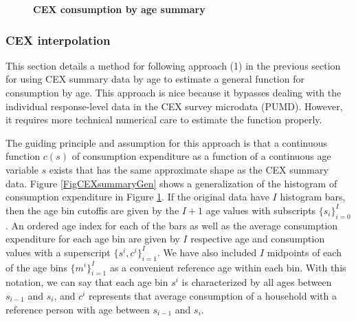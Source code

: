 \documentclass[letterpaper,12pt]{article}
\theoremstyle{definition}
\begin{document}
    \begin{figure}[htb]\centering\captionsetup{width=4.0in}
      \caption{\textbf{CEX consumption by age summary}}\label{FigCEXsummary}
    \end{figure}


    \subsubsection{CEX interpolation}\label{SecDataConsInterp}

      This section details a method for following approach (1) in the previous section for using CEX summary data by age to estimate a general function for consumption by age. This approach is nice because it bypasses dealing with the individual response-level data in the CEX survey microdata (PUMD). However, it requires more technical numerical care to estimate the function properly.

      The guiding principle and assumption for this approach is that a continuous function $c(s)$ of consumption expenditure as a function of a continuous age variable $s$ exists that has the same approximate shape as the CEX summary data. Figure \ref{FigCEXsummaryGen} shows a generalization of the histogram of consumption expenditure in Figure \ref{FigCEXsummary}. If the original data have $I$ histogram bars, then the age bin cutoffis are given by the $I+1$ age values with subscripts $\{s_i\}_{i=0}^I$. An ordered age index for each of the bars as well as the average consumption expenditure for each age bin are given by $I$ respective age and consumption values with a superscript $\{s^i, c^i\}_{i=1}^I$. We have also included $I$ midpoints of each of the age bins $\{m^i\}_{i=1}^I$ as a convenient reference age within each bin. With this notation, we can say that each age bin $s^i$ is characterized by all ages between $s_{i-1}$ and $s_i$, and $c^i$ represents that average consumption of a household with a reference person with age between $s_{i-1}$ and $s_i$.
\end{document}
